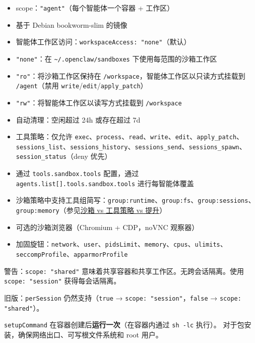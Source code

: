 \begin{itemize}
  \item scope：\texttt{"agent"}（每个智能体一个容器 + 工作区）
  \item 基于 Debian bookworm-slim 的镜像
  \item 智能体工作区访问：\texttt{workspaceAccess: "none"}（默认）
  \item \texttt{"none"}：在 \texttt{\textasciitilde{}/.openclaw/sandboxes} 下使用每范围的沙箱工作区
  \item \texttt{"ro"}：将沙箱工作区保持在 \texttt{/workspace}，智能体工作区以只读方式挂载到 \texttt{/agent}（禁用 \texttt{write}/\texttt{edit}/\texttt{apply\_patch}）
  \item \texttt{"rw"}：将智能体工作区以读写方式挂载到 \texttt{/workspace}
  \item 自动清理：空闲超过 24h 或存在超过 7d
  \item 工具策略：仅允许 \texttt{exec}、\texttt{process}、\texttt{read}、\texttt{write}、\texttt{edit}、\texttt{apply\_patch}、\texttt{sessions\_list}、\texttt{sessions\_history}、\texttt{sessions\_send}、\texttt{sessions\_spawn}、\texttt{session\_status}（deny 优先）
  \item 通过 \texttt{tools.sandbox.tools} 配置，通过 \texttt{agents.list[].tools.sandbox.tools} 进行每智能体覆盖
  \item 沙箱策略中支持工具组简写：\texttt{group:runtime}、\texttt{group:fs}、\texttt{group:sessions}、\texttt{group:memory}（参见\href{/gateway/sandbox-vs-tool-policy-vs-elevated\#tool-groups-shorthands}{沙箱 vs 工具策略 vs 提升}）
  \item 可选的沙箱浏览器（Chromium + CDP，noVNC 观察器）
  \item 加固旋钮：\texttt{network}、\texttt{user}、\texttt{pidsLimit}、\texttt{memory}、\texttt{cpus}、\texttt{ulimits}、\texttt{seccompProfile}、\texttt{apparmorProfile}
\end{itemize}


警告：\texttt{scope: "shared"} 意味着共享容器和共享工作区。无跨会话隔离。使用 \texttt{scope: "session"} 获得每会话隔离。

旧版：\texttt{perSession} 仍然支持（\texttt{true} → \texttt{scope: "session"}，\texttt{false} → \texttt{scope: "shared"}）。

\texttt{setupCommand} 在容器创建后\textbf{运行一次}（在容器内通过 \texttt{sh -lc} 执行）。
对于包安装，确保网络出口、可写根文件系统和 root 用户。

